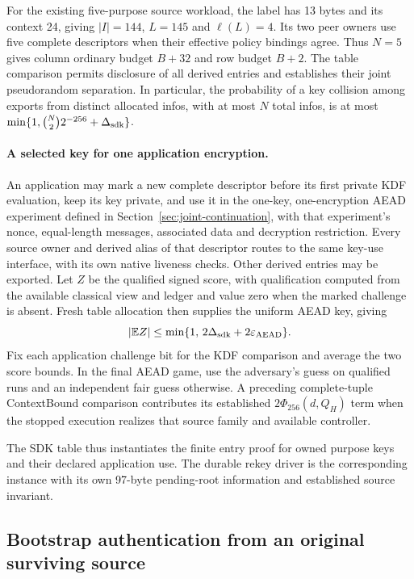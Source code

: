 \documentclass[pdflatex]{sn-jnl}
\theoremstyle{thmstyleone}
\theoremstyle{thmstylethree}
\theoremstyle{thmstyletwo}
\begin{document}
For the existing five-purpose source workload, the label has 13 bytes and
its context 24, giving $|I|=144$, $L=145$ and $\ell(L)=4$. Its two peer
owners use five complete descriptors when their effective policy bindings
agree. Thus $N=5$ gives column ordinary budget $B+32$ and row budget $B+2$.
The table comparison permits disclosure of all derived entries and
establishes their joint pseudorandom separation. In particular, the
probability of a key collision among exports from distinct allocated infos,
with at most $N$ total infos, is at most $\min\{1,\binom N2 2^{-256}+\Delta_{\rm sdk}\}$.

\paragraph{A selected key for one application encryption.}
An application may mark a new complete descriptor before its first private
KDF evaluation, keep its key private, and use it in the one-key,
one-encryption AEAD experiment defined in
Section~\ref{sec:joint-continuation}, with that experiment's nonce,
equal-length messages, associated data and decryption restriction. Every source owner and derived alias of that descriptor routes
to the same key-use interface, with its own native liveness checks. Other
derived entries may be exported. Let $Z$ be the qualified signed score,
with qualification computed from the available classical view and ledger
and value zero when the marked challenge is absent. Fresh table allocation
then supplies the uniform AEAD key, giving
\[
 |\mathbb E Z|\le\min\{1,\,2\Delta_{\rm sdk}
                                  +2\varepsilon_{\rm AEAD}\}.
\]
Fix each application challenge bit for the KDF comparison and average the
two score bounds. In the final AEAD game, use the adversary's guess on
qualified runs and an independent fair guess otherwise. A preceding
complete-tuple ContextBound comparison contributes its established
$2\Phi_{256}(d,Q_H)$ term when the stopped execution realizes that source
family and available controller.

The SDK table thus instantiates the finite entry proof for owned purpose
keys and their declared application use. The durable rekey driver is the
corresponding instance with its own 97-byte pending-root information and
established source invariant.

\subsection{Bootstrap authentication from an original surviving source}
\label{sec:bootstrap-authentication}
\end{document}
